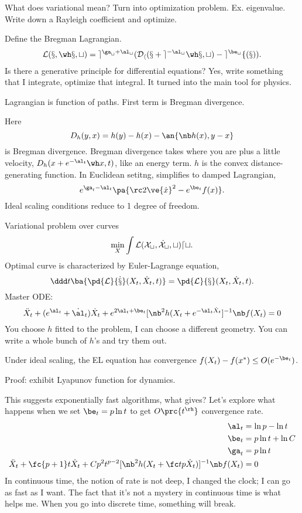 What does variational mean? Turn into optimization problem. Ex. eigenvalue. Write down a Rayleigh coefficient and optimize. 

Define the Bregman Lagrangian.
$$
\cal L (x, \wh x, t) = e^{\ga_t+\al_t}(D_h(x+e^{-\al_t} \wh x, t) - e^{\be_t}f(x)).
$$
Is there a generative principle for differential equations? Yes, write something that I integrate, optimize that integral. It turned into the main tool for physics.

Lagrangian is function of paths. First term is Bregman divergence. 

Here
$$
D_h(y,x)=h(y)-h(x) - \an{\nb h(x),y-x}
$$
is Bregman divergence.
Bregman divergence takes where you are plus a little velocity, $D_h(x+e^{-\al_t} \wh x, t) $, like an energy term. $h$ is the convex distance-generating function.
In Euclidean setitng, simplifies to damped Lagrangian, $$e^{\ga_t-\al_t}\pa{\rc 2\ve{\dot x}^2 - e^{\be_t}f(x)}.$$ Ideal scaling conditions reduce to 1 degree of freedom.

Variational problem over curves 
$$
\min_X\int \cal L(X_t,\dot X_t, t)dt.
$$
Optimal curve is characterized by Euler-Lagrange equation,
$$
\ddd t\ba{\pd{\cal L}{\dot x} (X_t,\dot X_t, t)} = \pd{\cal L}{x}(X_t,\dot X_t,t).
$$
Master ODE:
$$
\ddot X_t + (e^{\al_t}+ \dot \al_t)\dot X_t + e^{2\al_t + \be_t}[\nb^2 h(X_t+e^{-\al_t \dot X_t}]^{-1}\nb f(X_t)=0
$$
%
You choose $h$ fitted to the problem, I can choose a different geometry. You can write a whole bunch of $h$'s and try them out.

\begin{thm}
Under ideal scaling, the EL equation has convergence $f(X_t) - f(x^*)\le O(e^{-\be_t})$. 
\end{thm}
Proof: exhibit Lyapunov function for dynamics. 

This suggests exponentially fast algorithms, what gives?
Let's explore what happens when we set $\be_t=p\ln t$ to get $O\prc{t^\rh}$ convergence rate.
\begin{align}
\al_t &=\ln p - \ln t\\
\be_t &=p\ln t + \ln C\\
\ga_t&=p\ln t\\
\ddot X_t + \fc{p+1}t \dot X_t + Cp^2t^{p-2}[\nb^2 h(X_t+\fc tp \dot X_t)]^{-1}\nb f(X_t)&=0
\end{align}
In continuous time, the notion of rate is not deep, I changed the clock; I can go as fast as I want. The fact that it's not a mystery in continuous time is what helps me. When you go into discrete time, something will break.

